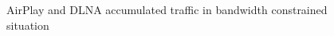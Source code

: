 \begin{figure}[hb]%
\caption{AirPlay and DLNA accumulated traffic in
bandwidth constrained situation\label{all_traffic_bw_1}}
\end{figure}
\clearpage

